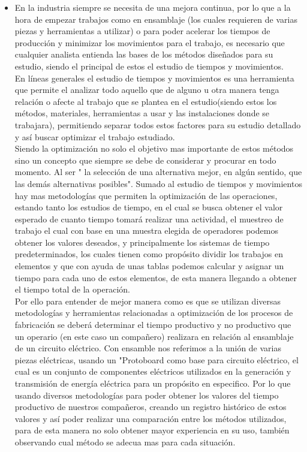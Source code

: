     
    \begin{itemize}
        \item En la industria siempre se necesita de una mejora continua, por lo que a la hora de empezar trabajos como en ensamblaje (los cuales requieren de varias piezas y herramientas a utilizar) o para poder acelerar los tiempos de producción y minimizar los movimientos para el trabajo, es necesario que cualquier analista entienda las bases de los métodos diseñados para su estudio, siendo el principal de estos el estudio de tiempos y movimientos.\cite{RAE}
        \\En líneas generales el estudio de tiempos y movimientos es una herramienta que permite el analizar todo aquello que de alguno u otra manera tenga relación o afecte al trabajo que se plantea en el estudio(siendo estos los métodos, materiales, herramientas a usar y las instalaciones donde se trabajara), permitiendo separar todos estos factores para su estudio detallado y así buscar optimizar el trabajo estudiado.
        \\Siendo la optimización no solo el objetivo mas importante de estos métodos sino un concepto que siempre se debe de considerar y procurar en todo momento. Al ser " la selección de una alternativa mejor, en algún sentido, que las demás alternativas posibles"\cite{Pontificia2001}. Sumado al estudio de tiempos y movimientos hay mas metodologías que permiten la optimización de las operaciones, estando tanto los estudios de tiempo, en el cual  se busca obtener el valor esperado de cuanto tiempo tomará realizar una actividad, el muestreo de trabajo el cual con base en una muestra elegida de operadores podemos obtener los valores deseados, y principalmente los sistemas de tiempo predeterminados, los cuales tienen como propósito dividir los trabajos en elementos y que con ayuda de unas tablas podemos calcular y asignar un tiempo para cada uno de estos elementos, de esta manera llegando a obtener el tiempo total de la operación.\cite{EstTrabajo}
        \\Por ello para entender de mejor manera como es que se utilizan diversas metodologías y herramientas relacionadas a optimización de los procesos de fabricación se deberá determinar el tiempo productivo y no productivo que un operario (en este caso un compañero) realizara en relación al ensamblaje de un circuito eléctrico. Con ensamble nos referimos a la unión de varias piezas eléctricas, usando un "Protoboard como base para circuito eléctrico, el cual es un conjunto de componentes eléctricos utilizados en la generación y transmisión de energía eléctrica para un propósito en especifico.\cite{CircElec}
        Por lo que usando diversos metodologías para poder obtener los valores del tiempo productivo de nuestros compañeros, creando un registro histórico de estos valores y así poder realizar una comparación entre los métodos utilizados, para de esta manera no solo obtener mayor experiencia en su uso, también observando cual método se adecua mas para cada situación.
    
    \end{itemize}
